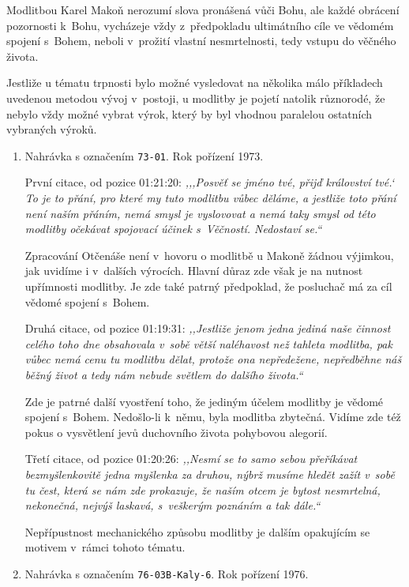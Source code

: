 Modlitbou Karel Makoň nerozumí slova pronášená vůči Bohu, ale každé obrácení
pozornosti k~Bohu, vycházeje vždy z~předpokladu ultimátního cíle ve vědomém
spojení s~Bohem, neboli v~prožití vlastní nesmrtelnosti, tedy vstupu do věčného
života.

Jestliže u tématu trpnosti bylo možné vysledovat na několika málo příkladech
uvedenou metodou vývoj v~postoji, u modlitby je pojetí natolik různorodé, že
nebylo vždy možné vybrat výrok, který by byl vhodnou paralelou ostatních
vybraných výroků.

\begin{enumerate}
  \item{
    Nahrávka s označením \texttt{73-01}.
    Rok pořízení 1973.

    První citace, od pozice 01:21:20: \textit{%
      ,,{},Posvěť se jméno tvé, přijď království tvé.` To je to přání, pro které
      my tuto modlitbu vůbec děláme, a jestliže toto přání není naším přáním,
      nemá smysl je vyslovovat a nemá taky smysl od této modlitby očekávat
      spojovací účinek s~Věčností. Nedostaví se.``
    }

    Zpracování Otčenáše není v~hovoru o modlitbě u Makoně žádnou výjimkou, jak
    uvidíme i v~dalších výrocích. Hlavní důraz zde však je na nutnost upřímnosti
    modlitby. Je zde také patrný předpoklad, že posluchač má za cíl vědomé
    spojení s~Bohem.

    Druhá citace, od pozice 01:19:31: \textit{%
      ,,Jestliže jenom jedna jediná naše činnost celého toho dne obsahovala v~sobě
      větší naléhavost než tahleta modlitba, pak vůbec nemá cenu tu modlitbu
      dělat, protože ona nepředežene, nepředběhne náš běžný život a tedy nám
      nebude světlem do dalšího života.``
    }

    Zde je patrné další vyostření toho, že jediným účelem modlitby je vědomé
    spojení s~Bohem. Nedošlo-li k~němu, byla modlitba zbytečná. Vidíme zde též
    pokus o vysvětlení jevů duchovního života pohybovou alegorií.

    Třetí citace, od pozice 01:20:26: \textit{%
      ,,Nesmí se to samo sebou přeříkávat bezmyšlenkovitě jedna myšlenka za
      druhou, nýbrž musíme hledět zažít v~sobě tu čest, která se nám zde
      prokazuje, že naším otcem je bytost nesmrtelná, nekonečná, nejvýš laskavá,
      s~veškerým poznáním a tak dále.``
    }

    Nepřípustnost mechanického způsobu modlitby je dalším opakujícím se motivem
    v~rámci tohoto tématu.
  }
  \item{
    Nahrávka s označením \texttt{76-03B-Kaly-6}.
    Rok pořízení 1976.

}
\end{enumerate}
